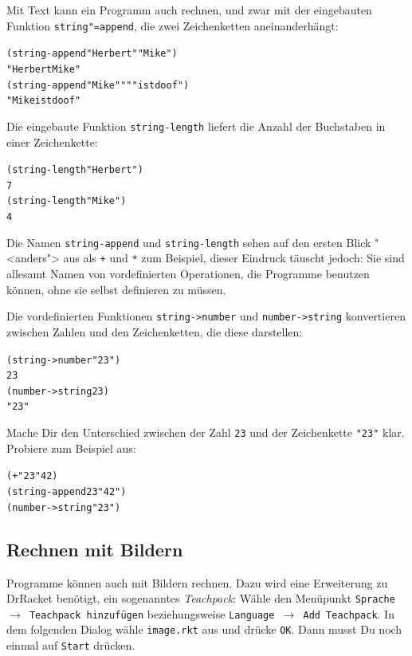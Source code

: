 Mit Text kann ein Programm auch rechnen, und zwar mit der eingebauten
Funktion
\texttt{string"=append},
die zwei Zeichenketten aneinanderhängt:
%
\begin{alltt}
(string-append "Herbert" "Mike")
\evalsto{} "HerbertMike"
(string-append "Mike" " " "ist doof")
\evalsto{} "Mike ist doof"
\end{alltt}
%
Die eingebaute Funktion
\texttt{string-length}
liefert die Anzahl der Buchstaben in einer Zeichenkette:
%
\begin{alltt}
(string-length "Herbert")
\evalsto{} 7
(string-length "Mike")
\evalsto{} 4
\end{alltt}
%
Die Namen \texttt{string-append} und \texttt{string-length} sehen auf
den ersten Blick "<anders"> aus als \texttt{+} und \texttt{*} zum
Beispiel, dieser Eindruck täuscht jedoch: Sie sind allesamt Namen von
vordefinierten Operationen, die Programme benutzen können, ohne sie
selbst definieren zu müssen.

Die vordefinierten Funktionen
\texttt{string->number}
und \texttt{number->string} konvertieren zwischen Zahlen und den
Zeichenketten, die diese darstellen:
%
\begin{alltt}
(string->number "23")
\evalsto{} 23
(number->string 23)
\evalsto{} "23"
\end{alltt}
%
\begin{aufgabeinline}
  Mache Dir den Unterschied zwischen der Zahl \texttt{23} und der
  Zeichenkette \verb|"23"| klar.  Probiere zum Beispiel aus:
\begin{alltt}
(+ "23" 42)
(string-append 23 "42")
(number->string "23")
\end{alltt}
\end{aufgabeinline}

\subsection{Rechnen mit Bildern}
\label{sec:rechnen-mit-bildern}

Programme können auch mit Bildern rechnen.  Dazu wird eine Erweiterung
zu DrRacket benötigt, ein sogenanntes
\textit{Teachpack}: Wähle den Menüpunkt
\texttt{Sprache $\rightarrow$ Teachpack hinzufügen} beziehungsweise
\texttt{Language $\rightarrow$ Add Teachpack}.  In dem folgenden Dialog
wähle \texttt{image.rkt} aus und drücke 
\texttt{OK}.  Dann musst Du noch einmal auf \texttt{Start} drücken.

